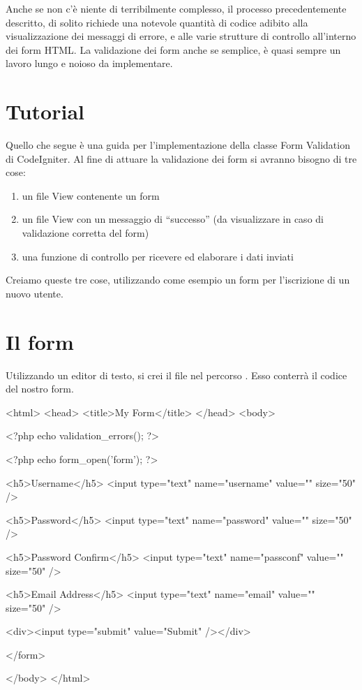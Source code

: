 Anche se non c'è niente di terribilmente complesso, il processo precedentemente descritto, di solito richiede una notevole quantità di codice adibito alla visualizzazione dei messaggi di errore, e alle varie strutture di controllo all'interno dei form \ac{HTML}. La validazione dei form anche se semplice, è quasi sempre un lavoro lungo e noioso da implementare.

\section*{Tutorial}
Quello che segue è una guida per l'implementazione della classe Form Validation di CodeIgniter. Al fine di attuare la validazione dei form si avranno bisogno di tre cose:

\begin{enumerate}
\item un file View contenente un form
\item un file View con un messaggio di ``successo'' (da visualizzare in caso di validazione corretta del form)
\item una funzione di controllo per ricevere ed elaborare i dati inviati
\end{enumerate}

Creiamo queste tre cose, utilizzando come esempio un form per l'iscrizione di un nuovo utente.

\section*{Il form}
Utilizzando un editor di testo, si crei il file  nel percorso . Esso conterrà il codice del nostro form.

\begin{html}
<html>
<head>
<title>My Form</title>
</head>
<body>

<?php echo validation_errors(); ?>

<?php echo form_open('form'); ?>

<h5>Username</h5>
<input type="text" name="username" value="" size="50" />

<h5>Password</h5>
<input type="text" name="password" value="" size="50" />

<h5>Password Confirm</h5>
<input type="text" name="passconf" value="" size="50" />

<h5>Email Address</h5>
<input type="text" name="email" value="" size="50" />

<div><input type="submit" value="Submit" /></div>

</form>

</body>
</html>
\end{html}

